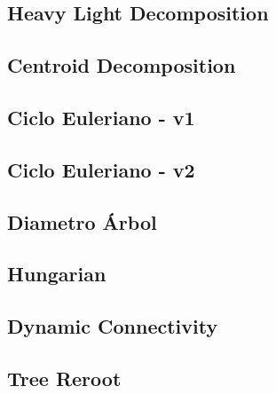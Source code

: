 \subsection{Heavy Light Decomposition}

\subsection{Centroid Decomposition}

\subsection{Ciclo Euleriano - v1}

\subsection{Ciclo Euleriano - v2}

\subsection{Diametro \'Arbol}

\subsection{Hungarian}

\subsection{Dynamic Connectivity}

\subsection{Tree Reroot}

